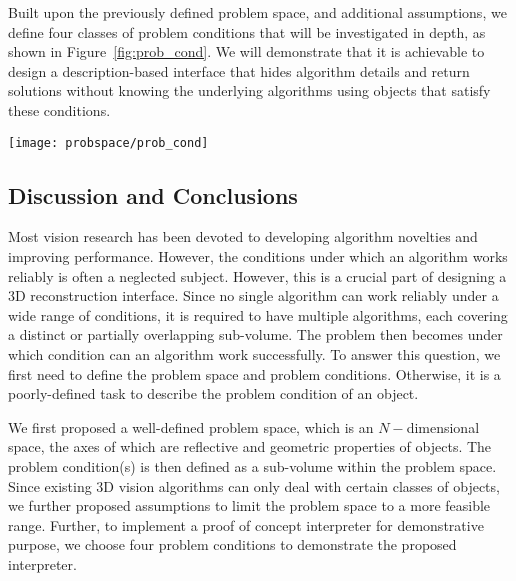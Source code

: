 Built upon the previously defined problem space, and additional assumptions, we define four classes of problem conditions that will be investigated in depth, as shown in Figure~\ref{fig:prob_cond}. We will demonstrate that it is achievable to design a description-based interface that hides algorithm details and return solutions without knowing the underlying algorithms using objects that satisfy these conditions.
\begin{figure*}[!htbp]
\centering
\texttt{[image: probspace/prob\_cond]}
\caption{Four problem conditions selected based on the definition of problem space and additional assumptions. The description-based interface will be evaluated using objects satisfying these conditions.}
\label{fig:prob_cond}
\end{figure*}

\subsection{Discussion and Conclusions}
Most vision research has been devoted to developing algorithm novelties and improving performance. However, the conditions under which an algorithm works reliably is often a neglected subject. However, this is a crucial part of designing a 3D reconstruction interface. Since no single algorithm can work reliably under a wide range of conditions, it is required to have multiple algorithms, each covering a distinct or partially overlapping sub-volume. The problem then becomes under which condition can an algorithm work successfully. To answer this question, we first need to define the problem space and problem conditions. Otherwise, it is a poorly-defined task to describe the problem condition of an object.

We first proposed a well-defined problem space, which is an $N-$dimensional space, the axes of which are reflective and geometric properties of objects. The problem condition(s) is then defined as a sub-volume within the problem space. Since existing 3D vision algorithms can only deal with certain classes of objects, we further proposed assumptions to limit the problem space to a more feasible range. Further, to implement a proof of concept interpreter for demonstrative purpose, we choose four problem conditions to demonstrate the proposed interpreter.

